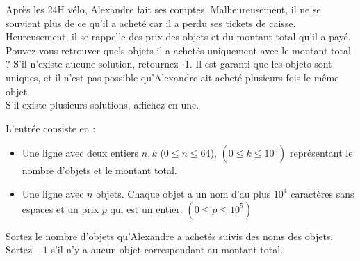 \problemname{\problemyamlname}

\newcommand{\maxk}{10^5}
\newcommand{\maxn}{64}

Après les 24H vélo, Alexandre fait ses comptes. Malheureusement, il ne se souvient plus de ce qu'il a acheté car il a perdu ses tickets de caisse. Heureusement, il se rappelle des prix des objets et du montant total qu'il a payé. Pouvez-vous retrouver quels objets il a achetés uniquement avec le montant total ? S'il n'existe aucune solution, retournez -1. Il est garanti que les objets sont uniques, et il n'est pas possible qu'Alexandre ait acheté plusieurs fois le même objet. \\
S'il existe plusieurs solutions, affichez-en une.

\begin{Input}
    L'entrée consiste en :
    \begin{itemize}
        \item Une ligne avec deux entiers $n, k$ ($0 \leq n \leq \maxn$), $(0 \leq k \leq \maxk)$ représentant le nombre d'objets et le montant total.
        \item Une ligne avec $n$ objets. Chaque objet a un nom d'au plus $10^4$ caractères sans espaces et un prix $p$ qui est un entier. $(0 \leq p \leq \maxk)$
    \end{itemize}
\end{Input}

\begin{Output}
    Sortez le nombre d'objets qu'Alexandre a achetés suivis des noms des objets. Sortez $-1$ s'il n'y a aucun objet correspondant au montant total.
\end{Output}
